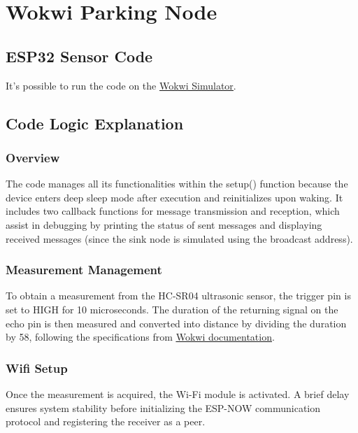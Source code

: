 \documentclass{Configuration_Files/PoliMi3i_thesis}
\begin{document}
\mainmatter %

\chapter{Wokwi Parking Node}
\label{ch:wokwi_parking_node}%
\section{ESP32 Sensor Code}
It's possible to run the code on the \underline{\href{https://wokwi.com/projects/425479908380980225}{Wokwi Simulator}}.


\section{Code Logic Explanation}

\subsection{Overview}
The code manages all its functionalities within the setup() function because the device enters deep sleep mode after execution and reinitializes upon waking. It includes two callback functions for message transmission and reception, which assist in debugging by printing the status of sent messages and displaying received messages (since the sink node is simulated using the broadcast address).
\subsection{Measurement Management}
To obtain a measurement from the HC-SR04 ultrasonic sensor, the trigger pin is set to HIGH for 10 microseconds. The duration of the returning signal on the echo pin is then measured and converted into distance by dividing the duration by 58, following the specifications from \underline{\href{https://docs.wokwi.com/parts/wokwi-hc-sr04}{Wokwi documentation}}.
\subsection{Wifi Setup}
Once the measurement is acquired, the Wi-Fi module is activated. A brief delay ensures system stability before initializing the ESP-NOW communication protocol and registering the receiver as a peer.
\end{document}
